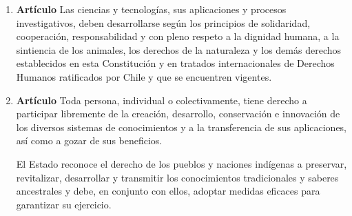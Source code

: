 \documentclass[11pt, a4paper]{article}
\begin{document}
\begin{enumerate}
\item \textbf{Artículo} \newline
Las ciencias y tecnologías, sus aplicaciones y procesos investigativos, deben desarrollarse según los principios de solidaridad, cooperación, responsabilidad y con pleno respeto a la dignidad humana, a la sintiencia de los animales, los derechos de la naturaleza y los demás derechos establecidos en esta Constitución y en tratados internacionales de Derechos Humanos ratificados por Chile y que se encuentren vigentes. 


\item \textbf{Artículo} \newline
Toda persona, individual o colectivamente, tiene derecho a participar libremente de la creación, desarrollo, conservación e innovación de los diversos sistemas de conocimientos y a la transferencia de sus aplicaciones, así como a gozar de sus beneficios. 

El Estado reconoce el derecho de los pueblos y naciones indígenas a preservar, revitalizar, desarrollar y transmitir los conocimientos tradicionales y saberes ancestrales y debe, en conjunto con ellos, adoptar medidas eficaces para garantizar su ejercicio. 


\end{enumerate}
\end{document}
